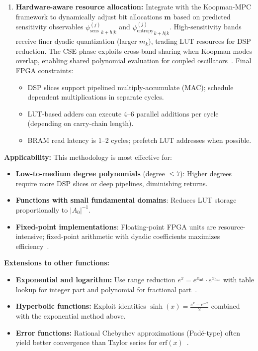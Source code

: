 \begin{enumerate}
    \item \textbf{Hardware-aware resource allocation:} Integrate with the Koopman-MPC framework to dynamically adjust bit allocations $\mathbf{m}$ based on predicted sensitivity observables ${\psi_{\text{sens}}^{(j)}}_{k+h|k}$ and ${\psi_{\text{entropy}}^{(j)}}_{k+h|k}$. High-sensitivity bands receive finer dyadic quantization (larger $m_k$), trading LUT resources for DSP reduction. The CSE phase exploits cross-band sharing when Koopman modes overlap, enabling shared polynomial evaluation for coupled oscillators~\cite{Gustafsson2007}. Final FPGA constraints:
    \begin{itemize}
        \item DSP slices support pipelined multiply-accumulate (MAC); schedule dependent multiplications in separate cycles.
        \item LUT-based adders can execute 4–6 parallel additions per cycle (depending on carry-chain length).
        \item BRAM read latency is 1–2 cycles; prefetch LUT addresses when possible.
    \end{itemize}
\end{enumerate}

\noindent\textbf{Applicability:} This methodology is most effective for:
\begin{itemize}
    \item \textbf{Low-to-medium degree polynomials} (degree $\leq 7$): Higher degrees require more DSP slices or deep pipelines, diminishing returns.
    \item \textbf{Functions with small fundamental domains}: Reduces LUT storage proportionally to $|A_0|^{-1}$.
    \item \textbf{Fixed-point implementations}: Floating-point FPGA units are resource-intensive; fixed-point arithmetic with dyadic coefficients maximizes efficiency~\cite{Muller2006,SinhaSrikanthan2014}.
\end{itemize}

\noindent\textbf{Extensions to other functions:}
\begin{itemize}
    \item \textbf{Exponential and logarithm:} Use range reduction $e^x = e^{x_{\text{int}}} \cdot e^{x_{\text{frac}}}$ with table lookup for integer part and polynomial for fractional part~\cite{Muller2006}.
    \item \textbf{Hyperbolic functions:} Exploit identities $\sinh(x) = \frac{e^x - e^{-x}}{2}$ combined with the exponential method above.
    \item \textbf{Error functions:} Rational Chebyshev approximations (Padé-type) often yield better convergence than Taylor series for $\text{erf}(x)$~\cite{NIST:DLMF}.
\end{itemize}

